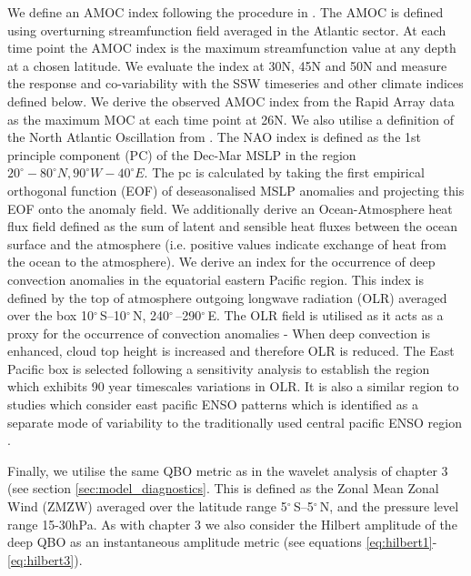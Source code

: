We define an AMOC index following the procedure in \cite{reichlerStratospheric2012}. The AMOC is defined using overturning streamfunction field averaged in the Atlantic sector. At each time point the AMOC index is the maximum streamfunction value at any depth at a chosen latitude. We evaluate the index at 30N, 45N and 50N and measure the response and co-variability with the SSW timeseries and other climate indices defined below. We derive the observed AMOC index from the Rapid Array data as the maximum MOC at each time point at 26N. We also utilise a definition of the North Atlantic Oscillation from \cite{hurrellNorth2003}. The NAO index is defined as the 1st principle component (PC) of the Dec-Mar MSLP in the region $20^{\circ}-80^{\circ}N, 90^{\circ}W-40^{\circ}E$. The pc is calculated by taking the first empirical orthogonal function (EOF) of deseasonalised MSLP anomalies and projecting this EOF onto the anomaly field. We additionally derive an Ocean-Atmosphere heat flux field defined as the sum of latent and sensible heat fluxes between the ocean surface and the atmosphere (i.e. positive values indicate exchange of heat from the ocean to the atmosphere). We derive an index for the occurrence of deep convection anomalies in the equatorial eastern Pacific region. This index is defined by the top of atmosphere outgoing longwave radiation (OLR) averaged over the box 10$^{\circ}$\,S–10$^{\circ}$\,N, 240$^{\circ}$\,–290$^{\circ}$\,E. The OLR field is utilised as it acts as a proxy for the occurrence of convection anomalies - When deep convection is enhanced, cloud top height is increased and therefore OLR is reduced. The East Pacific box is selected following a sensitivity analysis to establish the region which exhibits 90 year timescales variations in OLR. It is also a similar region to studies which consider east pacific ENSO patterns which is identified as a separate mode of variability to the traditionally used central pacific ENSO region \citep{johnsonHow2013}.

Finally, we utilise the same QBO metric as in the wavelet analysis of chapter 3 (see section \ref{sec:model_diagnostics}. This is defined as the Zonal Mean Zonal Wind (ZMZW) averaged over the latitude range 5$^{\circ}$\,S–5$^{\circ}$\,N,  and the pressure level range 15-30hPa. As with chapter 3 we also consider the Hilbert amplitude of the deep QBO as an instantaneous amplitude metric (see equations \ref{eq:hilbert1}-\ref{eq:hilbert3}). 

